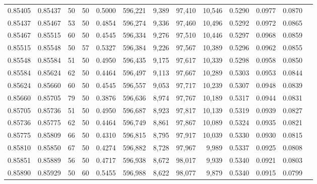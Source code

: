 \begin{tabular}{rrrrrrrrrrrrr}
0.85405 & 0.85437 &    50 &  50 &                                     0.5000 & 596,221 &   9,389 &  97,410 &  10,546 & 0.5290 & 0.0977 & 0.0870 \\
0.85437 & 0.85467 &    53 &  50 &                                     0.4854 & 596,274 &   9,336 &  97,460 &  10,496 & 0.5292 & 0.0972 & 0.0865 \\
0.85467 & 0.85515 &    60 &  50 &                                     0.4545 & 596,334 &   9,276 &  97,510 &  10,446 & 0.5297 & 0.0968 & 0.0859 \\
0.85515 & 0.85548 &    50 &  57 &                                     0.5327 & 596,384 &   9,226 &  97,567 &  10,389 & 0.5296 & 0.0962 & 0.0855 \\
0.85548 & 0.85584 &    51 &  50 &                                     0.4950 & 596,435 &   9,175 &  97,617 &  10,339 & 0.5298 & 0.0958 & 0.0850 \\
0.85584 & 0.85624 &    62 &  50 &                                     0.4464 & 596,497 &   9,113 &  97,667 &  10,289 & 0.5303 & 0.0953 & 0.0844 \\
0.85624 & 0.85660 &    60 &  50 &                                     0.4545 & 596,557 &   9,053 &  97,717 &  10,239 & 0.5307 & 0.0948 & 0.0839 \\
0.85660 & 0.85705 &    79 &  50 &                                     0.3876 & 596,636 &   8,974 &  97,767 &  10,189 & 0.5317 & 0.0944 & 0.0831 \\
0.85705 & 0.85736 &    51 &  50 &                                     0.4950 & 596,687 &   8,923 &  97,817 &  10,139 & 0.5319 & 0.0939 & 0.0827 \\
0.85736 & 0.85775 &    62 &  50 &                                     0.4464 & 596,749 &   8,861 &  97,867 &  10,089 & 0.5324 & 0.0935 & 0.0821 \\
0.85775 & 0.85809 &    66 &  50 &                                     0.4310 & 596,815 &   8,795 &  97,917 &  10,039 & 0.5330 & 0.0930 & 0.0815 \\
0.85810 & 0.85850 &    67 &  50 &                                     0.4274 & 596,882 &   8,728 &  97,967 &   9,989 & 0.5337 & 0.0925 & 0.0808 \\
0.85851 & 0.85889 &    56 &  50 &                                     0.4717 & 596,938 &   8,672 &  98,017 &   9,939 & 0.5340 & 0.0921 & 0.0803 \\
0.85890 & 0.85929 &    50 &  60 &                                     0.5455 & 596,988 &   8,622 &  98,077 &   9,879 & 0.5340 & 0.0915 & 0.0799 \\

\end{tabular}
